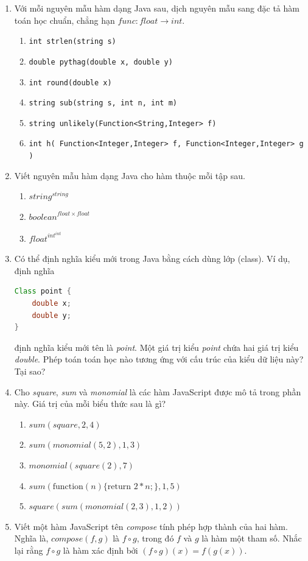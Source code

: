 \begin{enumerate}
\item[1.] Với mỗi nguyên mẫu hàm dạng Java sau, dịch nguyên mẫu sang đặc tả hàm toán học chuẩn, chẳng hạn $\mathit{func}\colon \mathit{float} \to \mathit{int}$.
\begin{enumerate}[label=\alph*)]
\item \texttt{int strlen(string s)}
\item \texttt{double pythag(double x, double y)}
\item \texttt{int round(double x)}
\item \texttt{string sub(string s, int n, int m)}
\item \texttt{string unlikely(Function<String,Integer> f)}
\item \texttt{int h( Function<Integer,Integer> f, Function<Integer,Integer> g )}
\end{enumerate}

\item[2.] Viết nguyên mẫu hàm dạng Java cho hàm thuộc mỗi tập sau.
\begin{enumerate}[label=\alph*)]
\item $\mathit{string}^{\mathit{string}}$
\item $\mathit{boolean}^{\mathit{float} \times \mathit{float}}$
\item $\mathit{float}^{\mathit{int}^{\mathit{int}}}$
\end{enumerate}

\item[3.] Có thể định nghĩa kiểu mới trong Java bằng cách dùng lớp (class). Ví dụ, định nghĩa

\begin{lstlisting}[language=Java]
Class point {
    double x;
    double y;
}
\end{lstlisting}

định nghĩa kiểu mới tên là \textit{point}. Một giá trị kiểu \textit{point} chứa hai giá trị kiểu \textit{double}. Phép toán toán học nào tương ứng với cấu trúc của kiểu dữ liệu này? Tại sao?

\item[4.] Cho \textit{square}, \textit{sum} và \textit{monomial} là các hàm JavaScript được mô tả trong phần này. Giá trị của mỗi biểu thức sau là gì?
\begin{enumerate}[label=\alph*)]
\item $\mathit{sum}(\mathit{square}, 2, 4)$
\item $\mathit{sum}(\mathit{monomial}(5,2), 1, 3)$
\item $\mathit{monomial}(\mathit{square}(2), 7)$
\item $\mathit{sum}(\text{function}(n) \{ \text{return } 2*n; \}, 1, 5)$
\item $\mathit{square}(\mathit{sum}(\mathit{monomial}(2,3), 1, 2))$
\end{enumerate}

\item[5.] Viết một hàm JavaScript tên \textit{compose} tính phép hợp thành của hai hàm. Nghĩa là, $\mathit{compose}(f,g)$ là $f \circ g$, trong đó $f$ và $g$ là hàm một tham số. Nhắc lại rằng $f \circ g$ là hàm xác định bởi $(f \circ g)(x) = f(g(x))$.
\end{enumerate}

